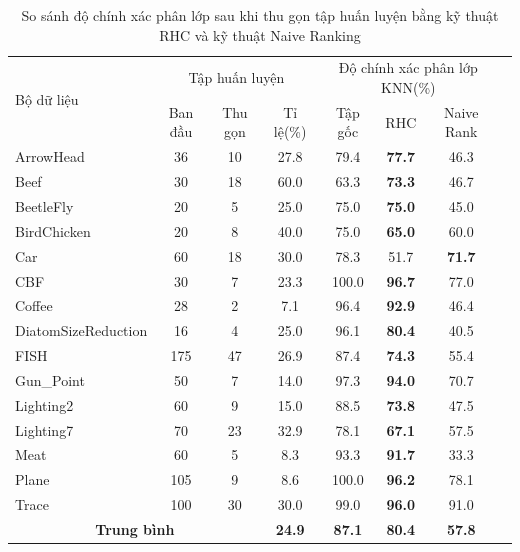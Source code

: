 \documentclass[13pt,oneside]{scrbook}
\begin{document}
\begin{table}[!htb]
\centering
    \begin{tabular}{| l | c | c | c | c | c | c | c |}
    \hline
	\multirow{2}{*}{Bộ dữ liệu} & \multicolumn{3}{c|}{Tập huấn luyện}& \multicolumn{3}{c|}{Độ chính xác phân lớp KNN(\%)}\\
	\cline{2-7}
    & Ban đầu & Thu gọn & Tỉ lệ(\%) & Tập gốc &  RHC &Naive Rank\\
	\hline
ArrowHead & 36 & 10 & 27.8 & 79.4 & \textbf{77.7} & 46.3\\ \hline
Beef & 30 & 18 & 60.0 & 63.3 & \textbf{73.3} & 46.7\\ \hline
BeetleFly & 20 & 5 & 25.0 & 75.0 & \textbf{75.0} & 45.0\\ \hline
BirdChicken & 20 & 8 & 40.0 & 75.0 & \textbf{65.0} & 60.0\\ \hline
Car & 60 & 18 & 30.0 & 78.3 & 51.7 & \textbf{71.7}\\ \hline
CBF & 30 & 7 & 23.3 & 100.0 & \textbf{96.7} & 77.0\\ \hline
Coffee & 28 & 2 & 7.1 & 96.4 & \textbf{92.9} & 46.4\\ \hline
DiatomSizeReduction & 16 & 4 & 25.0 & 96.1 & \textbf{80.4} & 40.5\\ \hline
FISH & 175 & 47 & 26.9 & 87.4 & \textbf{74.3} & 55.4\\ \hline
Gun\_Point & 50 & 7 & 14.0 & 97.3 & \textbf{94.0} & 70.7\\ \hline
Lighting2 & 60 & 9 & 15.0 & 88.5 & \textbf{73.8} & 47.5\\ \hline
Lighting7 & 70 & 23 & 32.9 & 78.1 & \textbf{67.1} & 57.5\\ \hline
Meat & 60 & 5 & 8.3 & 93.3 & \textbf{91.7} & 33.3\\ \hline
Plane & 105 & 9 & 8.6 & 100.0 & \textbf{96.2} & 78.1\\ \hline
Trace & 100 & 30 & 30.0 & 99.0 & \textbf{96.0} & 91.0\\ \hline
\multicolumn{3}{|c|}{\textbf{Trung bình}} & \textbf{24.9} & \textbf{87.1} & \textbf{80.4} & \textbf{57.8}\\ \hline
    \end{tabular}
    \caption{So sánh độ chính xác phân lớp sau khi thu gọn tập huấn luyện bằng kỹ thuật RHC và kỹ thuật Naive Ranking}\label{tab:classificationresult}
\end{table}
\newpage
\end{document}
